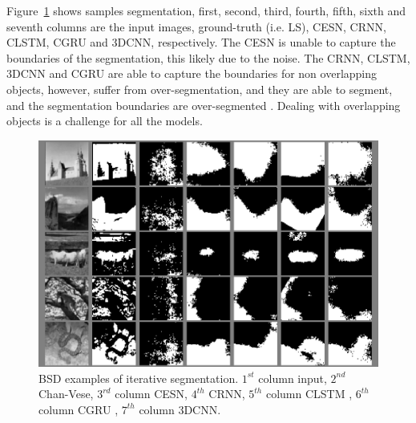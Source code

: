 \documentclass{WitsPhysicsReport}
\begin{document}
Figure~\ref{fig:sample_results_BSD} shows samples segmentation, first, second, third, fourth, fifth, sixth and seventh columns are the input images, ground-truth (i.e. LS), CESN, CRNN, CLSTM, CGRU and 3DCNN, respectively. The CESN is unable to capture the boundaries of the segmentation, this likely due to the noise. The CRNN, CLSTM, 3DCNN and CGRU are able to capture the boundaries for non overlapping objects, however, suffer from over-segmentation, and they are able to segment, and the segmentation boundaries are over-segmented . Dealing with overlapping objects
is a challenge for all the models.

\begin{figure}[H]
\centering
  \includegraphics[width=1\linewidth]{Figure/Results/BSR_sample.png}
 \caption{BSD examples of iterative segmentation. $1^{st}$ column input, $2^{nd}$ Chan-Vese, $3^{rd}$ column CESN, $4^{th}$ CRNN, $5^{th}$ column CLSTM , $6^{th}$ column CGRU , $7^{th}$ column 3DCNN.}
 \label{fig:sample_results_BSD}
\end{figure}



\end{document}
